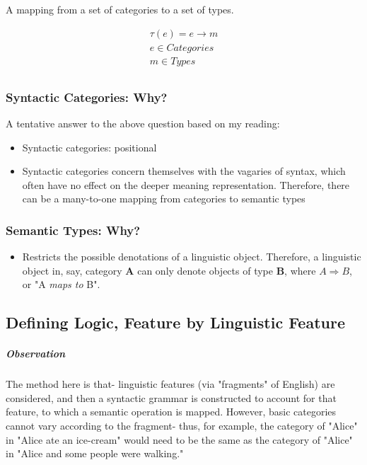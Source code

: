 \documentclass[letterpaper,12pt]{article}
\begin{document}
A mapping from a set of categories to a set of types.

\begin{equation}
\begin{split}
\tau ( e ) = e \rightarrow m \\
e \in Categories \\
m \in Types \\
\end{split}
\end{equation}


\subsubsection{Syntactic Categories: Why?}

A tentative answer to the above question based on my reading:

\begin{itemize}
\item
Syntactic categories: positional
\item
Syntactic categories concern themselves with the vagaries of syntax, which often have no effect on the deeper meaning representation. Therefore, there can be a many-to-one mapping from categories to semantic types
\end{itemize}

\subsubsection{Semantic Types: Why?}

\begin{itemize}
\item
Restricts the possible denotations of a linguistic object. Therefore, a linguistic object in, say, category \textbf{A} can only denote objects of type \textbf{B}, where $A \Rightarrow B$, or "A \textit{maps to} B".
\end{itemize}

\subsection{Defining Logic, Feature by Linguistic Feature}

\subparagraph{Observation}
The method here is that- linguistic features (via "fragments" of English) are considered, and then a syntactic grammar is constructed to account for that feature, to which a semantic operation is mapped. However, basic categories cannot vary according to the fragment- thus, for example, the category of "Alice" in "Alice ate an ice-cream" would need to be the same as the category of "Alice" in "Alice and some people were walking."
 
\end{document}
